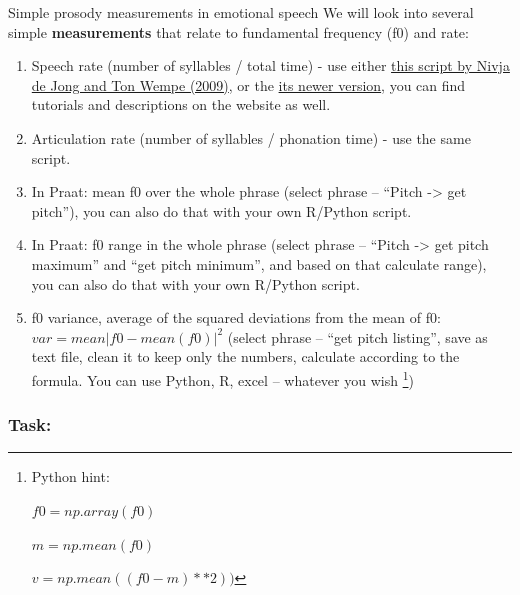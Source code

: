 \documentclass{../labbook}
\begin{document}
\begin{problem}{1}{10}{Simple prosody measurements in emotional speech}
We will look into several simple \textbf{measurements} that relate to fundamental frequency (f0) and rate:

\begin{enumerate}
    \item Speech rate (number of syllables / total time) - use either \href{https://sites.google.com/site/speechrate/speech-rate-praat-script-that-detects-syllable-nuclei/praat-script-syllable-nuclei-v2}{this script by Nivja de Jong and Ton Wempe (2009)}, or the \href{https://sites.google.com/view/uhm-o-meter}{its newer version}, you can find tutorials and descriptions on the website as well.
    \item Articulation rate (number of syllables / phonation time) - use the same script.
    \item In Praat: mean f0 over the whole phrase (select phrase – ``Pitch -> get pitch''), you can also do that with your own R/Python script.
    \item In Praat: f0 range in the whole phrase  (select phrase – ``Pitch -> get pitch maximum'' and ``get pitch minimum'', and based on that calculate range), you can also do that with your own R/Python script.
    \item f0 variance, average of the squared deviations from the mean of f0: 
$var = mean | f0 - mean (f0)|^2$  (select phrase -- ``get pitch listing'', 
save as text file, clean it to keep only the numbers, calculate according to the formula. You can use Python, R, excel – whatever you wish \footnote{Python hint: 

		$f0 = np.array(f0)$
  
		$m = np.mean(f0)$ 
  
		$v = np.mean((f0 - m)**2) )$ })

   
\end{enumerate}

\subsubsection*{Task:}


\end{problem}
\end{document}
